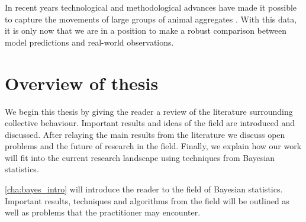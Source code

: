 In recent years technological and methodological advances have made it possible to capture the movements of large groups of animal aggregates \citep{ballerini08}. With this data, it is only now that we are in a position to make a robust comparison between model predictions and real-world observations.

\section{Overview of thesis}
\label{sec:overview_of_thesis}

We begin this thesis by giving the reader a review of the literature surrounding collective behaviour. Important results and ideas of the field are introduced and discussed. After relaying the main results from the literature we discuss open problems and the future of research in the field. Finally, we explain how our work will fit into the current research landscape using techniques from Bayesian statistics.

\cref{cha:bayes_intro} will introduce the reader to the field of Bayesian statistics. Important results, techniques and algorithms from the field will be outlined as well as problems that the practitioner may encounter. 